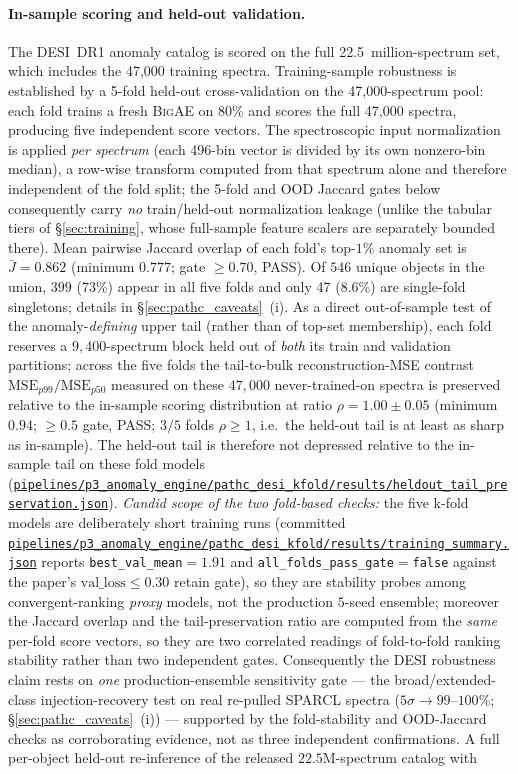 \documentclass[aps,prd,twocolumn,superscriptaddress,showpacs,preprintnumbers,nofootinbib,longbibliography,floatfix]{revtex4-2}
\newcommand{\repoBase}{https://github.com/Hubify-Projects/bigbounce/blob/main}
\newcommand{\artifact}[1]{\href{\repoBase/#1}{\nolinkurl{#1}}}
\newcommand{\BigAE}{\textsc{BigAE}}
\begin{document}
\paragraph{In-sample scoring and held-out validation.}
The DESI~DR1 anomaly catalog is scored on the full 22.5~million-spectrum set, which includes the 47{,}000 training spectra. Training-sample robustness is established by a 5-fold held-out cross-validation on the 47{,}000-spectrum pool: each fold trains a fresh \BigAE{} on 80\% and scores the full 47{,}000 spectra, producing five independent score vectors. The spectroscopic input normalization is applied \emph{per spectrum} (each 496-bin vector is divided by its own nonzero-bin median), a row-wise transform computed from that spectrum alone and therefore independent of the fold split; the 5-fold and OOD Jaccard gates below consequently carry \emph{no} train/held-out normalization leakage (unlike the tabular tiers of \S\ref{sec:training}, whose full-sample feature scalers are separately bounded there). Mean pairwise Jaccard overlap of each fold's top-$1\%$ anomaly set is $\bar{J} = 0.862$ (minimum $0.777$; gate $\geq 0.70$, PASS). Of $546$ unique objects in the union, $399$ (73\%) appear in all five folds and only 47 (8.6\%) are single-fold singletons; details in \S\ref{sec:pathc_caveats}~(i). As a direct out-of-sample test of the anomaly-\emph{defining} upper tail (rather than of top-set membership), each fold reserves a $9{,}400$-spectrum block held out of \emph{both} its train and validation partitions; across the five folds the tail-to-bulk reconstruction-MSE contrast $\mathrm{MSE}_{p99}/\mathrm{MSE}_{p50}$ measured on these $47{,}000$ never-trained-on spectra is preserved relative to the in-sample scoring distribution at ratio $\rho = 1.00 \pm 0.05$ (minimum $0.94$; $\geq\!0.5$ gate, PASS; $3/5$ folds $\rho \geq 1$, i.e.\ the held-out tail is at least as sharp as in-sample). The held-out tail is therefore not depressed relative to the in-sample tail on these fold models (\artifact{pipelines/p3\_anomaly\_engine/pathc\_desi\_kfold/results/heldout\_tail\_preservation.json}). \emph{Candid scope of the two fold-based checks:} the five k-fold models are deliberately short training runs (committed \artifact{pipelines/p3\_anomaly\_engine/pathc\_desi\_kfold/results/training\_summary.json} reports \texttt{best\_val\_mean}$=1.91$ and \texttt{all\_folds\_pass\_gate}$=$\texttt{false} against the paper's $\mathrm{val\_loss}\!\leq\!0.30$ retain gate), so they are stability probes among convergent-ranking \emph{proxy} models, not the production $5$-seed ensemble; moreover the Jaccard overlap and the tail-preservation ratio are computed from the \emph{same} per-fold score vectors, so they are two correlated readings of fold-to-fold ranking stability rather than two independent gates. Consequently the DESI robustness claim rests on \emph{one} production-ensemble sensitivity gate --- the broad/extended-class injection-recovery test on real re-pulled SPARCL spectra ($5\sigma\!\to\!99$--$100\%$; \S\ref{sec:pathc_caveats}~(i)) --- supported by the fold-stability and OOD-Jaccard checks as corroborating evidence, not as three independent confirmations. A full per-object held-out re-inference of the released $22.5$M-spectrum catalog with 
\end{document}
